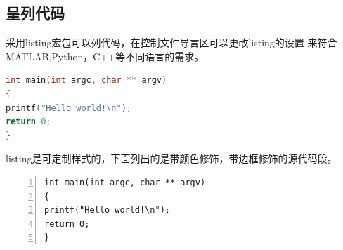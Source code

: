 \subsection{呈列代码}
采用listing宏包可以列代码，在控制文件导言区可以更改listing的设置
来符合MATLAB,Python，C++等不同语言的需求。
\begin{lstlisting}[language=C]
int main(int argc, char ** argv)
{
printf("Hello world!\n");
return 0;
}
\end{lstlisting}

listing是可定制样式的，下面列出的是带颜色修饰，带边框修饰的源代码段。
\begin{lstlisting}[language={[ANSI]C},numbers=left,numberstyle=\tiny,keywordstyle=\color{blue!70},commentstyle=\color{red!50!green!50!blue!50},frame=shadowbox,rulesepcolor=\color{red!20!green!20!blue!20}] 
int main(int argc, char ** argv)
{
printf("Hello world!\n");
return 0;
}
\end{lstlisting}
